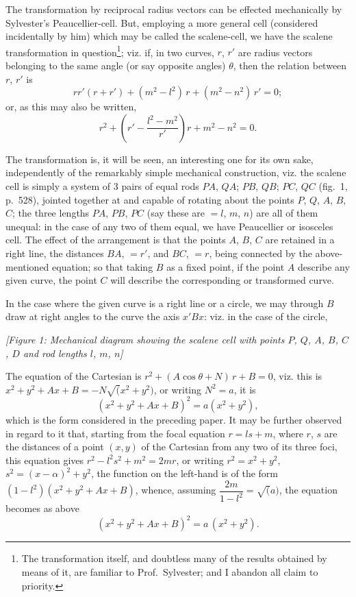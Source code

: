 \documentclass[11pt,a4paper]{book}
\begin{document}
The transformation by reciprocal radius vectors can be effected mechanically by Sylvester's Peaucellier-cell. But, employing a more general cell (considered incidentally by him) which may be called the scalene-cell, we have the scalene transformation in question\footnote{The transformation itself, and doubtless many of the results obtained by means of it, are familiar to Prof.~Sylvester; and I abandon all claim to priority.}; viz. if, in two curves, $r$, $r'$ are radius vectors belonging to the same angle (or say opposite angles) $\theta$, then the relation between $r$, $r'$ is
\[
rr'(r+r') + (m^2-l^2)\,r + (m^2-n^2)\,r' = 0;
\]
or, as this may also be written,
\[
r^2 + \left(r' - \frac{l^2-m^2}{r'}\right)r + m^2 - n^2 = 0.
\]

The transformation is, it will be seen, an interesting one for its own sake, independently of the remarkably simple mechanical construction, viz. the scalene cell is simply a system of 3 pairs of equal rods $PA$, $QA$; $PB$, $QB$; $PC$, $QC$ (fig.~1, p.~528), jointed together at and capable of rotating about the points $P$, $Q$, $A$, $B$, $C$; the three lengths $PA$, $PB$, $PC$ (say these are $= l$, $m$, $n$) are all of them unequal: in the case of any two of them equal, we have Peaucellier or isosceles cell. The effect of the arrangement is that the points $A$, $B$, $C$ are retained in a right line, the distances $BA$, $= r'$, and $BC$, $= r$, being connected by the above-mentioned equation; so that taking $B$ as a fixed point, if the point $A$ describe any given curve, the point $C$ will describe the corresponding or transformed curve.

In the case where the given curve is a right line or a circle, we may through $B$ draw at right angles to the curve the axis $x'Bx$: viz. in the case of the circle,

\begin{center}
\textit{[Figure 1: Mechanical diagram showing the scalene cell with points $P$, $Q$, $A$, $B$, $C$, $D$ and rod lengths $l$, $m$, $n$]}
\end{center}

The equation of the Cartesian is $r^2 + (A\cos\theta + N)\,r + B = 0$, viz. this is $x^2 + y^2 + Ax + B = -N\surd(x^2+y^2)$, or writing $N^2 = a$, it is
\[
(x^2 + y^2 + Ax + B)^2 = a(x^2 + y^2),
\]
which is the form considered in the preceding paper. It may be further observed in regard to it that, starting from the focal equation $r = ls + m$, where $r$, $s$ are the distances of a point $(x, y)$ of the Cartesian from any two of its three foci, this equation gives $r^2 - l^2s^2 + m^2 = 2mr$, or writing $r^2 = x^2 + y^2$, $s^2 = (x-\alpha)^2 + y^2$, the function on the left-hand is of the form $(1-l^2)(x^2 + y^2 + Ax + B)$, whence, assuming $\dfrac{2m}{1-l^2} = \surd(a)$, the equation becomes as above
\[
(x^2 + y^2 + Ax + B)^2 = a\,(x^2 + y^2).
\]
\end{document}
